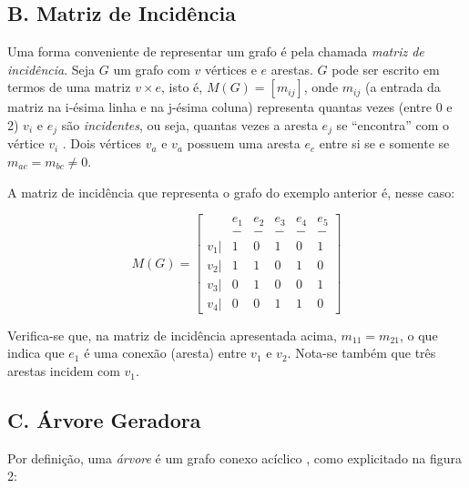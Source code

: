 \documentclass[twocolumn, 10pt]{extarticle}
\begin{document}
\subsection*{B. \quad Matriz de Incidência}

Uma forma conveniente de representar um grafo é pela chamada \textit{matriz de incidência}. Seja $G$ um grafo com $v$ vértices e $e$ arestas. $G$ pode ser escrito em termos de uma matriz $v \times e$, isto é, $M(G) = [m_{ij}]$, onde $m_{ij}$ (a entrada da matriz na i-ésima linha e na j-ésima coluna) representa quantas vezes (entre 0 e 2) $v_i$ e $e_j$ são \textit{incidentes}, ou seja, quantas vezes a aresta $e_j$ se ``encontra'' com o vértice $v_i$ \cite[p. 7]{bondy}. Dois vértices $v_a$ e $v_a$ possuem uma aresta $e_c$ entre si se e somente se $m_{ac} = m_{bc} \neq 0$.

A matriz de incidência que representa o grafo do exemplo anterior é, nesse caso:

\[
M(G) = 
\begin{bmatrix}
 & e_1 & e_2 & e_3 & e_4 & e_5 \\
 & - & - & - & - & - \\
 v_1 |& 1 & 0 & 1 & 0 & 1\\
 v_2 |& 1 & 1 & 0 & 1 & 0\\
 v_3 |& 0 & 1 & 0 & 0 & 1\\
 v_4 |& 0 & 0 & 1 & 1 & 0
\end{bmatrix}
\]

Verifica-se que, na matriz de incidência apresentada acima, $m_{11} = m_{21}$, o que indica que $e_1$ é uma conexão (aresta) entre $v_1$ e $v_2$. Nota-se também que três arestas incidem com $v_1$. 

\subsection*{C. \quad Árvore Geradora}

Por definição, uma \textit{árvore} é um grafo conexo acíclico \cite[p. 520]{sedgewick}, como explicitado na figura 2:
\end{document}
